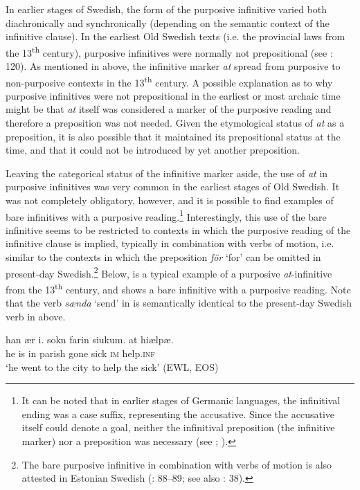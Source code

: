 \documentclass[output=paper]{langscibook}
\begin{document}
In earlier stages of Swedish, the form of the purposive infinitive varied both diachronically and synchronically (depending on the semantic context of the infinitive clause). In the earliest Old Swedish texts (i.e. the provincial laws from the 13\textsuperscript{th} century), purposive infinitives were normally not prepositional (see \citealt{Kalm2016Satsekvivalenta}: 120). As mentioned in  above, the infinitive marker \textit{at} spread from purposive to non-purposive contexts in the 13\textsuperscript{th} century. A possible explanation as to why purposive infinitives were not prepositional in the earliest or most archaic time might be that \textit{at} itself was considered a marker of the purposive reading and therefore a preposition was not needed. Given the etymological status of \textit{at} as a preposition, it is also possible that it maintained its prepositional status at the time, and that it could not be introduced by yet another preposition. 



Leaving the categorical status of the infinitive marker aside, the use of \textit{at} in purposive infinitives was very common in the earliest stages of Old Swedish. It was not completely obligatory, however, and it is possible to find examples of bare infinitives with a purposive reading.\footnote{It can be noted that in earlier stages of Germanic languages, the infinitival ending was a case suffix, representing the accusative. Since the accusative itself could denote a goal, neither the infinitival preposition (the infinitive marker) nor a preposition was necessary (see \citealt{Haspelmath1989}; \citealt{Jeffers1975}).} Interestingly, this use of the bare infinitive seems to be restricted to contexts in which the purposive reading of the infinitive clause is implied, typically in combination with verbs of motion, i.e. similar to the contexts in which the preposition \textit{för} ‘for’ can be omitted in present-day Swedish.\footnote{The bare purposive infinitive in combination with verbs of motion is also attested in Estonian Swedish (\citealt{Lagman1958}: 88–89; see also \citealt{Jorgensen1970}: 38).}  Below,  is a typical example of a purposive \textit{at}-infinitive from the 13\textsuperscript{th} century, and  shows a bare infinitive with a purposive reading. Note that the verb \textit{sænda} ‘send’ in  is semantically identical to the present-day Swedish verb in  above. 

\ea
\label{ex:kalm:9}
\ea \label{ex:kalm:9a}
\gll han ær i. sokn farin siukum. at hiælpæ.\\
 he is in parish gone sick \textsc{im} help.\textsc{inf}\\ 
\glt ‘he went to the city to help the sick’ (EWL, EOS)
\end{document}
